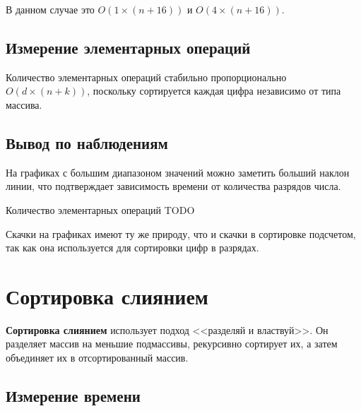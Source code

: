 \documentclass[11pt]{article}
\begin{document}
В данном случае это $O(1 \times (n + 16))$ и $O(4 \times (n + 16))$.

\subsection{Измерение элементарных операций}

\begin{center}
\end{center}
{ \hspace*{\fill} }

\begin{center}
\end{center}
{ \hspace*{\fill} }

Количество элементарных операций стабильно пропорционально $O(d \times (n + k))$,
поскольку сортируется каждая цифра независимо от типа массива.

\subsection{Вывод по наблюдениям}

На графиках с большим диапазоном значений можно заметить больший наклон линии, что подтверждает зависимость
времени от количества разрядов числа.

Количество элементарных операций TODO

Скачки на графиках имеют ту же природу, что и скачки в сортировке подсчетом, так как она используется для сортировки
цифр в разрядах.

\newpage

\setcounter{section}{9}
\section*{\centering Сортировка слиянием}

\textbf{Сортировка слиянием} использует подход <<разделяй и властвуй>>. Он разделяет массив на меньшие подмассивы,
рекурсивно сортирует их, а затем объединяет их в отсортированный массив.

\setcounter{subsection}{0}
\subsection{Измерение времени}
\end{document}
